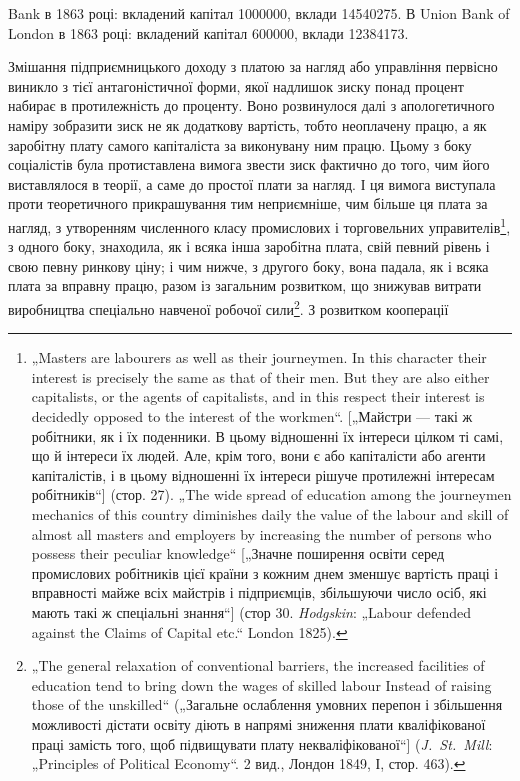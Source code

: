 \parcont{}  %
Bank в 1863 році: вкладений капітал \num{1000000},
вклади \num{14540275}. В Union Bank of London в
1863 році: вкладений капітал \num{600000}, вклади
\num{12384173}.

Змішання підприємницького доходу з платою за нагляд
або управління первісно виникло з тієї антагоністичної форми,
якої надлишок зиску понад процент набирає в протилежність
до проценту. Воно розвинулося далі з апологетичного наміру
зобразити зиск не як додаткову вартість, тобто неоплачену працю,
а як заробітну плату самого капіталіста за виконувану ним працю.
Цьому з боку соціалістів була протиставлена вимога звести зиск
фактично до того, чим його виставлялося в теорії, а саме до простої
плати за нагляд. І ця вимога виступала проти теоретичного
прикрашування тим неприємніше, чим більше ця плата за нагляд,
з утворенням численного класу промислових і торговельних
управителів\footnote{
„Masters are labourers as well as their journeymen. In this character their
interest is precisely the same as that of their men. But they are also either capitalists,
or the agents of capitalists, and in this respect their interest is decidedly
opposed to the interest of the workmen“. [„Майстри — такі ж робітники, як і їх
поденники. В цьому відношенні їх інтереси цілком ті самі, що й інтереси їх людей.
Але, крім того, вони є або капіталісти або агенти капіталістів, і в цьому відношенні
їх інтереси рішуче протилежні інтересам робітників“] (стор. 27). „The
wide spread of education among the journeymen mechanics of this country diminishes
daily the value of the labour and skill of almost all masters and employers
by increasing the number of persons who possess their peculiar knowledge“ [„Значне
поширення освіти серед промислових робітників цієї країни з кожним днем
зменшує вартість праці і вправності майже всіх майстрів і підприємців, збільшуючи
число осіб, які мають такі ж спеціальні знання“] (стор 30. \emph{Hodgskin}:
„Labour defended against the Claims of Capital etc.“ London 1825).
}, з одного боку, знаходила, як і всяка інша заробітна
плата, свій певний рівень і свою певну ринкову ціну; і чим
нижче, з другого боку, вона падала, як і всяка плата за вправну
працю, разом із загальним розвитком, що знижував витрати виробництва
спеціально навченої робочої сили\footnote{
„The general relaxation of conventional barriers, the increased facilities of education
tend to bring down the wages of skilled labour Instead of raising those of
the unskilled“ („Загальне ослаблення умовних перепон і збільшення можливості
дістати освіту діють в напрямі зниження плати кваліфікованої праці замість
того, щоб підвищувати плату некваліфікованої“] (\emph{J.~St.~Mill}: „Principles of Political
Economy“. 2 вид., Лондон 1849, І, стор. 463).
}. З розвитком кооперації

